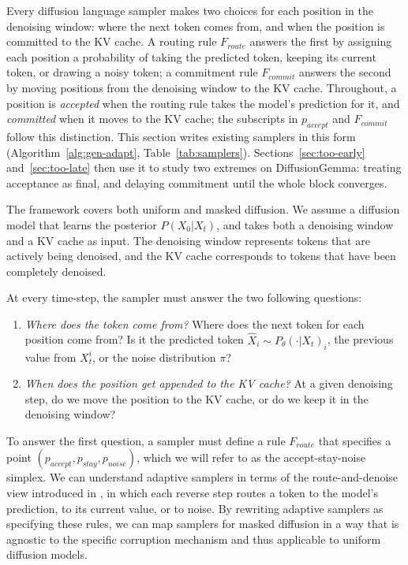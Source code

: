 Every diffusion language sampler makes two choices for each position in the denoising window: where the next token comes from, and when the position is committed to the KV cache.
A routing rule $F_{route}$ answers the first by assigning each position a probability of taking the predicted token, keeping its current token, or drawing a noisy token; a commitment rule $F_{commit}$ answers the second by moving positions from the denoising window to the KV cache.
Throughout, a position is \emph{accepted} when the routing rule takes the model's prediction for it, and \emph{committed} when it moves to the KV cache; the subscripts in $p_{accept}$ and $F_{commit}$ follow this distinction.
This section writes existing samplers in this form (Algorithm~\ref{alg:gen-adapt}, Table~\ref{tab:samplers}).
Sections~\ref{sec:too-early} and~\ref{sec:too-late} then use it to study two extremes on DiffusionGemma: treating acceptance as final, and delaying commitment until the whole block converges.

The framework covers both uniform and masked diffusion.
We assume a diffusion model that learns the posterior $P(X_0 | X_t)$, and takes both a denoising window and a KV cache as input.
The denoising window represents tokens that are actively being denoised, and the KV cache corresponds to tokens that have been completely denoised.


At every time-step, the sampler must answer the two following questions: 
\begin{enumerate}
    \item \textit{Where does the token come from?} Where does the next token for each position come from? Is it the predicted token $\hat{X}_i \sim P_{\theta}(\cdot | X_t)_i$, the previous value from $X_t^i$, or the noise distribution $\pi$? 
    \item \textit{When does the position get appended to the KV cache?} At a given denoising step, do we move the position to the KV cache, or do we keep it in the denoising window?
\end{enumerate}

To answer the first question, a sampler must define a rule $F_{route}$ that specifies a point $(p_{accept},\allowbreak p_{stay},\allowbreak p_{noise})$, which we will refer to as the accept-stay-noise simplex. 
We can understand adaptive samplers in terms of the route-and-denoise view introduced in \citet{zheng2023reparameterized}, in which each reverse step routes a token to the model's prediction, to its current value, or to noise.
By rewriting adaptive samplers as specifying these rules, we can map samplers for masked diffusion in a way that is agnostic to the specific corruption mechanism and thus applicable to uniform diffusion models.

